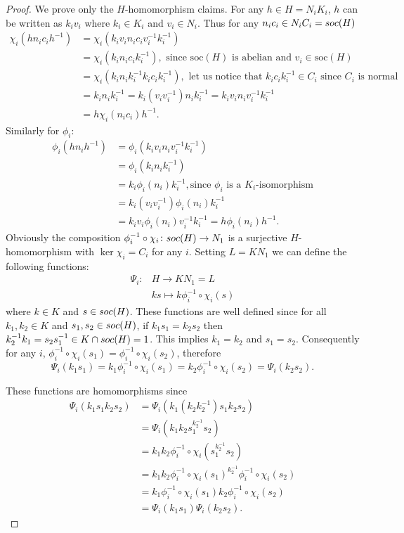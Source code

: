 \begin{proof}
    We prove only the $H$-homomorphism claims.
    For any $h \in H = N_iK_i$, $h$ can be written as $k_iv_i$ where $k_i \in K_i$ and $v_i \in N_i$. Thus for any $n_ic_i \in N_iC_i = soc {(H)}$
    \begin{align*}
        \chi_i(hn_ic_ih^{-1}) &= \chi_i(k_iv_in_ic_iv_i^{-1}k_i^{-1}) \\
        &= \chi_i(k_in_ic_ik_i^{-1}), \text{ since $\mathrm{soc}(H)$ is abelian and $v_i \in \mathrm{soc}(H)$} \\
        &= \chi_i(k_in_ik_i^{-1}k_ic_ik_i^{-1}), \text{ let us notice that $k_ic_ik_i^{-1} \in C_i$ since $C_i$ is normal} \\
        &= k_in_ik_i^{-1} = k_i(v_iv_i^{-1})n_ik_i^{-1} = k_iv_in_iv_i^{-1}k_i^{-1}\\
        &= h\chi_i(n_ic_i)h^{-1}.
    \end{align*}
    Similarly for $\phi_i$:
    \begin{align*}
        \phi_i(hn_ih^{-1}) &= \phi_i(k_iv_in_iv_i^{-1}k_i^{-1})\\
        &= \phi_i(k_in_ik_i^{-1}) \\
        &= k_i\phi_i(n_i)k_i^{-1}, \text{since $\phi_i$ is a $K_i$-isomorphism} \\
        &= k_i(v_iv_i^{-1})\phi_i(n_i)k_i^{-1} \\
        &= k_iv_i\phi_i(n_i)v_i^{-1}k_i^{-1}= h\phi_i(n_i)h^{-1}.
    \end{align*}
    Obviously the composition $\phi_i^{-1} \circ \chi_i \colon soc {(H)} \rightarrow N_1$ is a surjective $H$-homomorphism with $\ker \chi_i = C_i$ for any $i$. Setting $L=KN_1$ we can define the following functions:
    \begin{align*}
        \Psi_i \colon &H \longrightarrow KN_1 = L \\
                      &ks \mapsto k\phi_i^{-1} \circ \chi_i(s)
    \end{align*}
    where $k \in K$ and $s \in soc {(H)}$.
    These functions are well defined since for all $k_1, k_2 \in K$ and $s_1, s_2 \in soc {(H)}$, if $k_1s_1 = k_2s_2$ then $k_2^{-1}k_1 = s_2s_1^{-1} \in K \cap soc {(H)} = 1$. 
    This implies $k_1 = k_2$ and $s_1 = s_2$. 
    Consequently for any $i$, $\phi_i^{-1} \circ \chi_i(s_1) = \phi_i^{-1}\circ \chi_i(s_2)$, therefore 
    $$
    \Psi_i(k_1s_1) = k_1\phi_i^{-1} \circ \chi_i(s_1) = k_2\phi_i^{-1} \circ \chi_i(s_2) = \Psi_i(k_2s_2).
    $$

    These functions are homomorphisms since
    \begin{align*}
    \Psi_i(k_1s_1k_2s_2) & = \Psi_i(k_1(k_2k_2^{-1})s_1k_2s_2) \\
    & = \Psi_i(k_1k_2s_1^{k_2^{-1}}s_2) \\
    & = k_1k_2\phi_i^{-1} \circ \chi_i(s_1^{k_2^{-1}}s_2) \\
    & = k_1k_2\phi_i^{-1} \circ \chi_i(s_1)^{k_2^{-1}}\phi_i^{-1} \circ \chi_i(s_2) \\
    & = k_1\phi_i^{-1} \circ \chi_i(s_1)k_2\phi_i^{-1} \circ \chi_i(s_2) \\
    & = \Psi_i(k_1s_1)\Psi_i(k_2s_2).
    \end{align*}


\end{proof}
